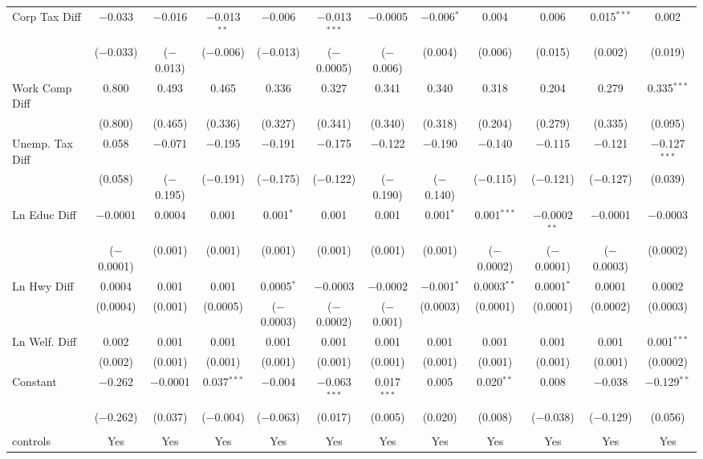 \begin{table}[!htbp]
\begin{tabular}{@{\extracolsep{5pt}}lccccccccccc}
  Corp Tax Diff & $-$0.033 & $-$0.016 & $-$0.013$^{**}$ & $-$0.006 & $-$0.013$^{***}$ & $-$0.0005 & $-$0.006$^{*}$ & 0.004 & 0.006 & 0.015$^{***}$ & 0.002 \\ 
  & ($-$0.033) & ($-$0.013) & ($-$0.006) & ($-$0.013) & ($-$0.0005) & ($-$0.006) & (0.004) & (0.006) & (0.015) & (0.002) & (0.019) \\ 
  Work Comp Diff & 0.800 & 0.493 & 0.465 & 0.336 & 0.327 & 0.341 & 0.340 & 0.318 & 0.204 & 0.279 & 0.335$^{***}$ \\ 
  & (0.800) & (0.465) & (0.336) & (0.327) & (0.341) & (0.340) & (0.318) & (0.204) & (0.279) & (0.335) & (0.095) \\ 
  Unemp. Tax Diff & 0.058 & $-$0.071 & $-$0.195 & $-$0.191 & $-$0.175 & $-$0.122 & $-$0.190 & $-$0.140 & $-$0.115 & $-$0.121 & $-$0.127$^{***}$ \\ 
  & (0.058) & ($-$0.195) & ($-$0.191) & ($-$0.175) & ($-$0.122) & ($-$0.190) & ($-$0.140) & ($-$0.115) & ($-$0.121) & ($-$0.127) & (0.039) \\ 
  Ln Educ Diff & $-$0.0001 & 0.0004 & 0.001 & 0.001$^{*}$ & 0.001 & 0.001 & 0.001$^{*}$ & 0.001$^{***}$ & $-$0.0002$^{**}$ & $-$0.0001 & $-$0.0003 \\ 
  & ($-$0.0001) & (0.001) & (0.001) & (0.001) & (0.001) & (0.001) & (0.001) & ($-$0.0002) & ($-$0.0001) & ($-$0.0003) & (0.0002) \\ 
  Ln Hwy Diff & 0.0004 & 0.001 & 0.001 & 0.0005$^{*}$ & $-$0.0003 & $-$0.0002 & $-$0.001$^{*}$ & 0.0003$^{**}$ & 0.0001$^{*}$ & 0.0001 & 0.0002 \\ 
  & (0.0004) & (0.001) & (0.0005) & ($-$0.0003) & ($-$0.0002) & ($-$0.001) & (0.0003) & (0.0001) & (0.0001) & (0.0002) & (0.0003) \\ 
  Ln Welf. Diff & 0.002 & 0.001 & 0.001 & 0.001 & 0.001 & 0.001 & 0.001 & 0.001 & 0.001 & 0.001 & 0.001$^{***}$ \\ 
  & (0.002) & (0.001) & (0.001) & (0.001) & (0.001) & (0.001) & (0.001) & (0.001) & (0.001) & (0.001) & (0.0002) \\ 
  Constant & $-$0.262 & $-$0.0001 & 0.037$^{***}$ & $-$0.004 & $-$0.063$^{***}$ & 0.017$^{***}$ & 0.005 & 0.020$^{**}$ & 0.008 & $-$0.038 & $-$0.129$^{**}$ \\ 
  & ($-$0.262) & (0.037) & ($-$0.004) & ($-$0.063) & (0.017) & (0.005) & (0.020) & (0.008) & ($-$0.038) & ($-$0.129) & (0.056) \\ 
 \hline \\[-1.8ex] 
controls & Yes & Yes & Yes & Yes & Yes & Yes & Yes & Yes & Yes & Yes & Yes \\ 

\end{tabular}
\end{table}
